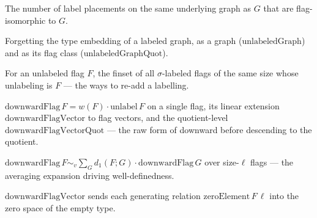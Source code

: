 \begin{definition}
  \label{def:isomorphism-count}
  \leanok
  The number of label placements on the same underlying graph as $G$ that are
  flag-isomorphic to $G$.
\end{definition}

\begin{definition}
  \label{def:unlabeled-graph}
  \leanok
  Forgetting the type embedding of a labeled graph, as a graph
  ($\mathrm{unlabeledGraph}$) and as its flag class
  ($\mathrm{unlabeledGraphQuot}$).
\end{definition}

\begin{definition}
  \label{def:label-extensions}
  \leanok
  For an unlabeled flag $F$, the finset of all $\sigma$-labeled flags of the same
  size whose unlabeling is $F$ --- the ways to re-add a labelling.
\end{definition}

\begin{definition}
  \label{def:downward-flag}
  \leanok
  $\mathrm{downwardFlag}\,F = w(F)\cdot\mathrm{unlabel}\,F$ on a single flag, its
  linear extension $\mathrm{downwardFlagVector}$ to flag vectors, and the
  quotient-level $\mathrm{downwardFlagVectorQuot}$ --- the raw form of downward
  before descending to the quotient.
\end{definition}

\begin{lemma}
  \label{lem:downward-flag-sum}
  \leanok
  $\mathrm{downwardFlag}\,F \sim_v \sum_{G} d_1(F;G)\cdot\mathrm{downwardFlag}\,G$
  over size-$\ell$ flags --- the averaging expansion driving well-definedness.
\end{lemma}

\begin{lemma}
  \label{lem:downward-zero-element}
  \leanok
  $\mathrm{downwardFlagVector}$ sends each generating relation
  $\mathrm{zeroElement}\,F\,\ell$ into the zero space of the empty type.
\end{lemma}

